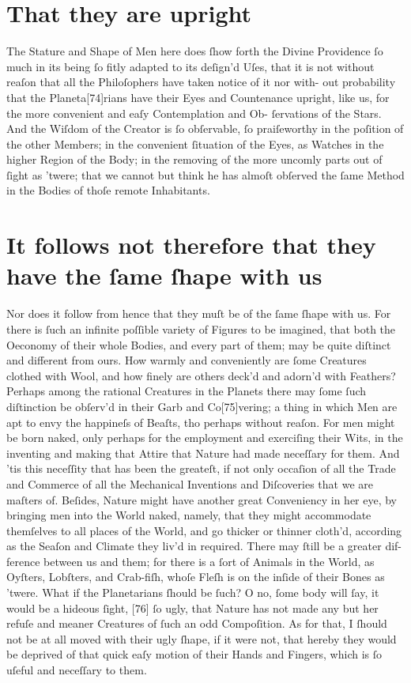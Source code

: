 \documentclass[letterpaper]{book}
\begin{document}
\section{That they are upright}

The Stature and Shape of Men here does ſhow forth the Divine Providence
ſo much in its being ſo fitly adapted to its deſign'd Uſes, that it is not
without reaſon that all the Philoſophers have taken notice of it nor with-
out probability that the Planeta[74]rians have their Eyes and Countenance
upright, like us, for the more convenient and eaſy Contemplation and Ob-
ſervations of the Stars. And the Wiſdom of the Creator is ſo obſervable,
ſo praiſeworthy in the poſition of the other Members; in the convenient
ſituation of the Eyes, as Watches in the higher Region of the Body; in the
removing of the more uncomly parts out of ſight as 'twere; that we cannot
but think he has almoſt obſerved the ſame Method in the Bodies of thoſe
remote Inhabitants.


\section{It follows not therefore that they have the ſame ſhape with us} 

Nor does it follow from hence that they muſt be of the ſame ſhape with us.
For there is ſuch an infinite poſſible variety of Figures to be imagined,
that both the Oeconomy of their whole Bodies, and every part of them; may be
quite diſtinct and different from ours. How warmly and conveniently are ſome
Creatures clothed with Wool, and how finely are others deck'd and adorn'd
with Feathers? Perhaps among the rational Creatures in the Planets there may
ſome ſuch diſtinction be obſerv'd in their Garb and Co[75]vering; a thing in
which Men are apt to envy the happineſs of Beaſts, tho perhaps without
reaſon. For men might be born naked, only perhaps for the employment and
exerciſing their Wits, in the inventing and making that Attire that Nature
had made neceſſary for them. And 'tis this neceſſity that has been the
greateſt, if not only occaſion of all the Trade and Commerce of all the
Mechanical Inventions and Diſcoveries that we are maſters of. Beſides,
Nature might have another great Conveniency in her eye, by bringing men into
the World naked, namely, that they might accommodate themſelves to all
places of the World, and go thicker or thinner cloth'd, according as the
Seaſon and Climate they liv'd in required. There may ſtill be a greater dif-
ference between us and them; for there is a ſort of Animals in the World, as
Oyſters, Lobſters, and Crab-fiſh, whoſe Fleſh is on the inſide of their
Bones as 'twere. What if the Planetarians ſhould be ſuch? O no, ſome body
will ſay, it would be a hideous ſight, [76] ſo ugly, that Nature has not
made any but her refuſe and meaner Creatures of ſuch an odd Compoſition. As
for that, I ſhould not be at all moved with their ugly ſhape, if it were
not, that hereby they would be deprived of that quick eaſy motion of their
Hands and Fingers, which is ſo uſeful and neceſſary to them.
\end{document}
